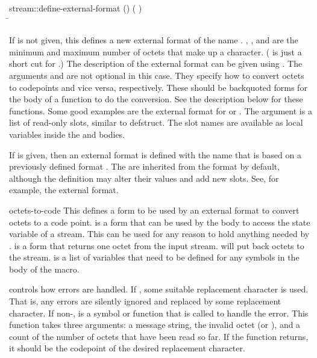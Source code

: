 \begin{defmac}[base]{stream::}{define-external-format}{\args {}
    ()
    (\amprest{} )
    \\
    \= \ampoptional{}    }


  If  is not given, this defines a new external format of
  the name . , , and  are the
  minimum and maximum number of octets that make up a character.
  ( is just a short cut for .)  The description of the external format can be
  given using .  The arguments 
  and  are not optional in this case.  They
  specify how to convert octets to codepoints and vice versa,
  respectively.  These should be backquoted forms for the body of a
  function to do the conversion.  See the description below for these
  functions.  Some good examples are the external format for
   or .  The  argument is a list of
  read-only slots, similar to defstruct.  The slot names are available
  as local variables inside the  and
   bodies. 

  If  is given, then an external format is defined with the
  name  that is based on a previously defined format
  . The  are inherited from the  format
  by default, although the definition may alter their values and add
  new slots. See, for example, the  external format. 

\end{defmac}

\begin{defmac}{}{octets-to-code}{\args {} 
      \amprest{} }
  This defines a form to be used by an external format to convert
  octets to a code point.   is a form that can be used by
  the body to access the state variable of a stream.  This can be used
  for any reason to hold anything needed by .
   is a form that returns one octet from the input stream.
   will put back  octets to the stream.   is a
  list of variables that need to be defined for any symbols in the
  body of the macro.

   controls how errors are handled.  If \nil, some suitable
  replacement character is used.  That is, any errors are silently
  ignored and replaced by some replacement character.  If non-\nil,
   is a symbol or function that is called to handle the
  error.  This function takes three arguments: a message string, the
  invalid octet (or \nil), and a count of the number of octets that
  have been read so far.  If the function returns, it should be the
  codepoint of the desired replacement character.
\end{defmac}

